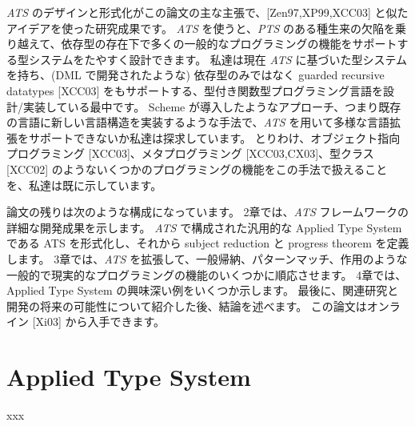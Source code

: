 \documentclass[submit,techreq,noauthor,onecolumn]{ipsj}
\begin{document}
{\it ATS} のデザインと形式化がこの論文の主な主張で、[Zen97,XP99,XCC03] と似たアイデアを使った研究成果です。
{\it ATS} を使うと、{\it PTS} のある種生来の欠陥を乗り越えて、依存型の存在下で多くの一般的なプログラミングの機能をサポートする型システムをたやすく設計できます。
私達は現在 {\it ATS} に基づいた型システムを持ち、(DML で開発されたような) 依存型のみではなく guarded recursive datatypes [XCC03] をもサポートする、型付き関数型プログラミング言語を設計/実装している最中です。
Scheme が導入したようなアプローチ、つまり既存の言語に新しい言語構造を実装するような手法で、{\it ATS} を用いて多様な言語拡張をサポートできないか私達は探求しています。
とりわけ、オブジェクト指向プログラミング [XCC03]、メタプログラミング [XCC03,CX03]、型クラス [XCC02] のようないくつかのプログラミングの機能をこの手法で扱えることを、私達は既に示しています。

論文の残りは次のような構成になっています。
2章では、{\it ATS} フレームワークの詳細な開発成果を示します。
{\it ATS} で構成された汎用的な Applied Type System である ATS を形式化し、それから subject reduction と progress theorem を定義します。
3章では、{\it ATS} を拡張して、一般帰納、パターンマッチ、作用のような一般的で現実的なプログラミングの機能のいくつかに順応させます。
4章では、Applied Type System の興味深い例をいくつか示します。
最後に、関連研究と開発の将来の可能性について紹介した後、結論を述べます。
この論文はオンライン [Xi03] から入手できます。

\section{Applied Type System}

xxx

\begin{acknowledgment}
\end{acknowledgment}

\begin{thebibliography}{10}
\end{thebibliography}
\end{document}
